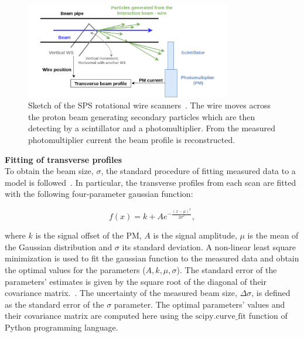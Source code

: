 \begin{figure}[!h]
   \centering         
   \includegraphics[width=0.8\textwidth]{images/Ch4/Wire_scanner.png}
       \caption{Sketch of the SPS rotational wire scanners~\cite{Berrig:1972478}. The wire moves across the proton beam generating secondary particles which are then detecting by a scintillator and a photomultiplier. From the measured photomultiplier current the beam profile is reconstructed.}
       \label{fig:SPS_WS_ROT}
\end{figure}


\normalsize{\textbf{Fitting of transverse profiles}}\\
To obtain the beam size, $\sigma$, the standard procedure of fitting measured data to a model is followed~\cite{gaus_fit_least_squares}. In particular, the transverse profiles from each scan are fitted with the following four-parameter gaussian function:

\begin{equation}\label{eq:4p_gauss}
   f(x) = k + A e^{-\frac{(x-\mu)^2}{2 \sigma^2}},
\end{equation}

where $k$ is the signal offset of the PM, $A$ is the signal amplitude, $\mu$ is the mean of the Gaussian distribution and $\sigma$ its standard deviation. A non-linear least square minimization is used to fit the gaussian function to the measured data and obtain the optimal values for the parameters ($A, k, \mu, \sigma$). The standard error of the parameters' estimates is given by the square root of the diagonal of their covariance matrix.~\cite{gaus_fit_least_squares}. The uncertainty of the measured beam size, $\Delta \sigma$, is defined as the standard error of the $\sigma$ parameter. The optimal parameters' values and their covariance matrix are computed here using the $\mathrm{scipy.curve \_ fit}$ \cite{scipy_curve_fit} function of Python programming language. 


